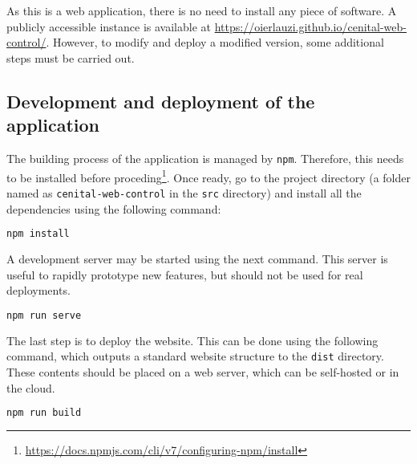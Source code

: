 \documentclass[../main.tex]{subfiles}
\begin{document}
As this is a web application, there is no need to install any piece of software. A publicly accessible instance is available at \url{https://oierlauzi.github.io/cenital-web-control/}. However, to modify and deploy a modified version, some additional steps must be carried out.\newline

\subsection{Development and deployment of the application}

The building process of the application is managed by \texttt{npm}. Therefore, this needs to be installed before proceding\footnote{\url{https://docs.npmjs.com/cli/v7/configuring-npm/install}}. Once ready, go to the project directory (a folder named as \texttt{cenital-web-control} in the \texttt{src} directory) and install all the dependencies using the following command:

\begin{lstlisting}[language=bash]
    npm install
\end{lstlisting}

A development server may be started using the next command. This server is useful to rapidly prototype new features, but should not be used for real deployments.

\begin{lstlisting}[language=bash]
    npm run serve
\end{lstlisting}

The last step is to deploy the website. This can be done using the following command, which outputs a standard website structure to the \texttt{dist} directory. These contents should be placed on a web server, which can be self-hosted or in the cloud.

\begin{lstlisting}[language=bash]
    npm run build
\end{lstlisting}
\end{document}
